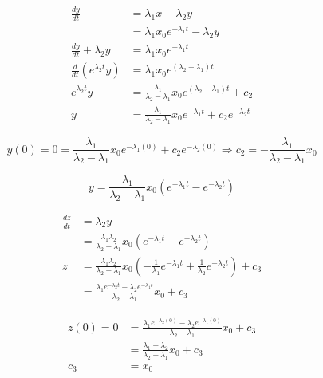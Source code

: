 \documentclass{article}
\begin{document}
\begin{align*}
  \frac{dy}{dt}                    & = \lambda_1 x - \lambda_2 y                                                           \\
                                   & = \lambda_1 x_0 e^{-\lambda_1 t} - \lambda_2 y                                        \\
  \frac{dy}{dt} + \lambda_2 y      & = \lambda_1 x_0 e^{-\lambda_1 t}                                                      \\
  \frac{d}{dt} (e^{\lambda_2 t} y) & = \lambda_1 x_0 e^{(\lambda_2 - \lambda_1) t}                                         \\
  e^{\lambda_2 t} y                & = \frac{\lambda_1}{\lambda_2 - \lambda_1} x_0 e^{(\lambda_2 - \lambda_1) t} + c_2     \\
  y                                & = \frac{\lambda_1}{\lambda_2 - \lambda_1} x_0 e^{-\lambda_1 t} + c_2 e^{-\lambda_2 t}
\end{align*}

\[y(0) = 0 = \frac{\lambda_1}{\lambda_2 - \lambda_1} x_0 e^{-\lambda_1 (0)} + c_2 e^{-\lambda_2 (0)} \Rightarrow c_2 = -\frac{\lambda_1}{\lambda_2 - \lambda_1} x_0\]

\[y = \frac{\lambda_1}{\lambda_2 - \lambda_1} x_0 (e^{-\lambda_1 t} - e^{-\lambda_2 t})\]

\begin{align*}
  \frac{dz}{dt} & = \lambda_2 y                                                                                                                                \\
                & = \frac{\lambda_1 \lambda_2}{\lambda_2 - \lambda_1} x_0 (e^{-\lambda_1 t} - e^{-\lambda_2 t})                                                \\
  z             & = \frac{\lambda_1 \lambda_2}{\lambda_2 - \lambda_1} x_0 (-\frac{1}{\lambda_1} e^{-\lambda_1 t} + \frac{1}{\lambda_2} e^{-\lambda_2 t}) + c_3 \\
                & = \frac{\lambda_1 e^{-\lambda_2 t} - \lambda_2 e^{-\lambda_1 t}}{\lambda_2 - \lambda_1} x_0 + c_3
\end{align*}

\begin{align*}
  z(0) = 0 & = \frac{\lambda_1 e^{-\lambda_2 (0)} - \lambda_2 e^{-\lambda_1 (0)}}{\lambda_2 - \lambda_1} x_0 + c_3 \\
           & = \frac{\lambda_1 - \lambda_2}{\lambda_2 - \lambda_1} x_0 + c_3                                       \\
  c_3      & = x_0
\end{align*}
\end{document}
